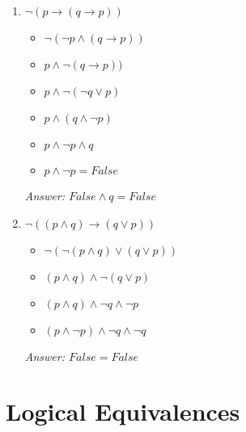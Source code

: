 \documentclass{article}
\begin{document}
\begin{enumerate}
\item
$\neg(p \to (q \to p))$ \\
\begin{itemize}
    \item $\neg(\neg p \land (q \to p))$\\
    \item $p \land \neg (q \to p))$\\
    \item $p \land \neg (\neg q \lor p)$\\
    \item $p \land (q \land \neg p)$\\
    \item $p \land \neg p \land q$\\
    \item $p \land \neg p = False $\\
\end{itemize}
\emph{Answer: $False \land q = False $\\}

\item
$\neg((p \land q) \to (q \lor p))$\\
\begin{itemize}
    \item$\neg(\neg (p \land q) \lor (q \lor p))$\\
    \item$(p \land q) \land \neg (q \lor p)$\\
    \item$(p \land q) \land \neg q \land \neg p$\\
    \item$(p \land \neg p) \land \neg q \land \neg q$\\
\end{itemize}

\emph{Answer: $False = False$}

\end{enumerate}
\section*{Logical Equivalences}
\end{document}
